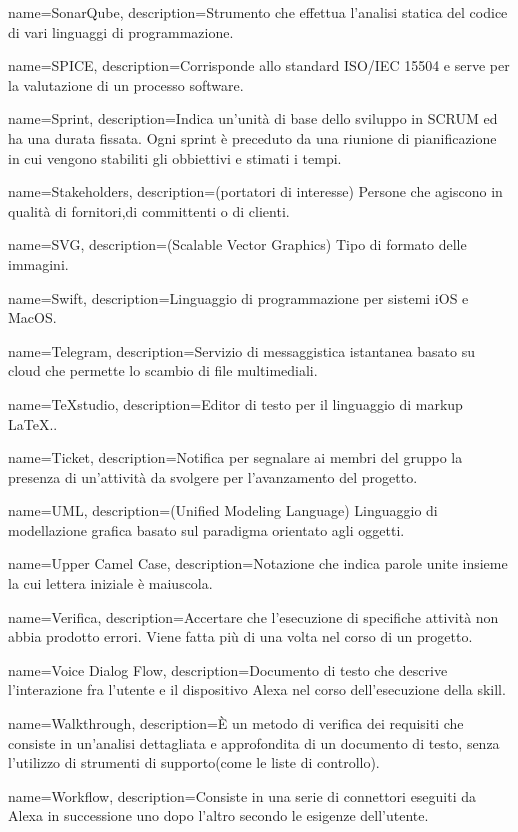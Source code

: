 {
name={SonarQube},
description={Strumento che effettua l’analisi statica del codice di vari linguaggi di programmazione.}
}

{
name={SPICE},
description={Corrisponde allo standard ISO/IEC 15504 e serve per la valutazione di un processo software.}
}

{
name={Sprint},
description={Indica un’unità di base dello sviluppo in SCRUM ed ha una durata fissata. Ogni sprint è preceduto da una riunione di pianificazione in cui vengono stabiliti gli obbiettivi e stimati i tempi.}
}

{
name={Stakeholders},
description={(portatori di interesse) Persone che agiscono in qualità di fornitori,di committenti o di clienti.}
}

{
name={SVG},
description={(Scalable Vector Graphics) Tipo di formato delle immagini.}
}

{
name={Swift},
description={Linguaggio di programmazione per sistemi iOS e MacOS.}
}

{
name={Telegram},
description={Servizio di messaggistica istantanea basato su cloud che permette lo scambio di file multimediali.}
}

{
name={TeXstudio},
description={Editor di testo per il linguaggio di markup \LaTeX..}
}

{
name={Ticket},
description={Notifica per segnalare ai membri del gruppo la presenza di un’attività da svolgere per l’avanzamento del progetto.}
}

{
name={UML},
description={(Unified Modeling Language) Linguaggio di modellazione grafica basato sul paradigma orientato agli oggetti.}
}

{
name={Upper Camel Case},
description={Notazione che indica parole unite insieme la cui lettera iniziale è maiuscola.}
}

{
name={Verifica},
description={Accertare che l’esecuzione di specifiche attività non abbia prodotto errori. Viene fatta più di una volta nel corso di un progetto.}
}

{
name={Voice Dialog Flow},
description={Documento di testo che descrive l'interazione fra l'utente e il dispositivo Alexa nel corso dell'esecuzione della skill.}
}

{
name={Walkthrough},
description={È un metodo di verifica dei requisiti che consiste in un'analisi dettagliata e approfondita di un documento di testo, senza l'utilizzo di strumenti di supporto(come le liste di controllo).}
}

{
name={Workflow},
description={Consiste in una serie di connettori eseguiti da Alexa in successione uno dopo l'altro secondo le esigenze dell'utente. }
}